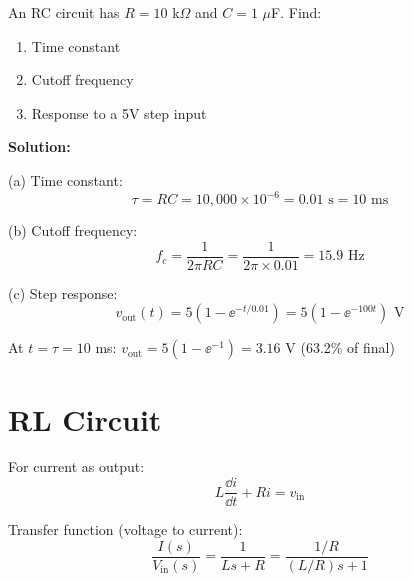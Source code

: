 \begin{examplebox}[title=Example 1.6: RC Circuit Step Response]
An RC circuit has $R = 10$ k$\Omega$ and $C = 1$ $\mu$F. Find:
\begin{enumerate}[label=(\alph*)]
    \item Time constant
    \item Cutoff frequency
    \item Response to a 5V step input
\end{enumerate}

\textbf{Solution:}

(a) Time constant:
\begin{equation}
\tau = RC = 10{,}000 \times 10^{-6} = 0.01 \text{ s} = 10 \text{ ms}
\end{equation}

(b) Cutoff frequency:
\begin{equation}
f_c = \frac{1}{2\pi RC} = \frac{1}{2\pi \times 0.01} = 15.9 \text{ Hz}
\end{equation}

(c) Step response:
\begin{equation}
v_{\text{out}}(t) = 5(1 - \ee^{-t/0.01}) = 5(1 - \ee^{-100t}) \text{ V}
\end{equation}

At $t = \tau = 10$ ms: $v_{\text{out}} = 5(1 - \ee^{-1}) = 3.16$ V (63.2\% of final)
\end{examplebox}





\section{RL Circuit}
\label{sec:rl_circuit}



For current as output:
\begin{equation}
L\frac{\dd i}{\dd t} + Ri = v_{\text{in}}
\end{equation}

Transfer function (voltage to current):
\begin{equation}
\frac{I(s)}{V_{\text{in}}(s)} = \frac{1}{Ls + R} = \frac{1/R}{(L/R)s + 1}
\end{equation}

